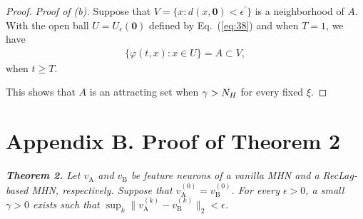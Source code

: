 \begin{proof}
\noindent \textit{Proof of (b).}
Suppose that $V = \{x : d(x, \bm{0}) < \epsilon^{\prime}\}$ is a neighborhood of $A$.
With the open ball $U = U_{\epsilon}(\bm{0})$ defined by Eq.~(\ref{eq:38}) and when $T = 1$, we have
\begin{align}
\{\varphi(t, x) : x \in U\} = A \subset V,
\end{align}
when $t \geq T$.

This shows that $A$ is an attracting set when $\gamma > N_{H}$ for every fixed $\xi$.
\end{proof}

\section*{Appendix B. Proof of Theorem 2}
\textit{\textbf{Theorem 2.}
Let $v_{\mathrm{A}}$ and $v_{\mathrm{B}}$ be feature neurons of a vanilla MHN and a RecLag-based MHN, respectively. Suppose that $v_{\mathrm{A}}^{(0)} = v_{\mathrm{B}}^{(0)}$. For every $\epsilon > 0$,
a small $\gamma > 0$ exists such that $\sup_{k} \|v_{\mathrm{A}}^{(k)} - v_{\mathrm{B}}^{(k)}\|_{2} < \epsilon$.
}

